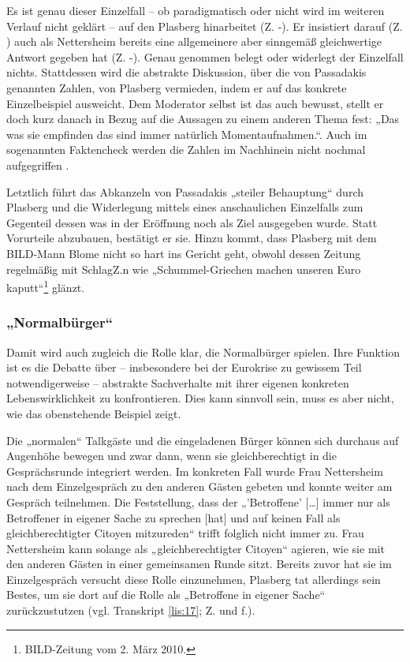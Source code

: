 Es ist genau dieser Einzelfall – ob paradigmatisch oder nicht wird im weiteren Verlauf nicht geklärt – auf den Plasberg hinarbeitet (Z. -). Er insistiert darauf (Z. ) auch als Nettersheim bereits eine allgemeinere aber sinngemäß gleichwertige Antwort gegeben hat (Z. -). Genau genommen belegt oder widerlegt der Einzelfall nichts. Stattdessen wird die abstrakte Diskussion, über die von Passadakis genannten Zahlen, von Plasberg vermieden, indem er auf das konkrete Einzelbeispiel ausweicht. Dem Moderator selbst ist das auch bewusst, stellt er doch kurz danach in Bezug auf die Aussagen zu einem anderen Thema fest: „Das was sie empfinden das sind immer natürlich Momentaufnahmen.“. Auch im sogenannten Faktencheck werden die Zahlen im Nachhinein nicht nochmal aufgegriffen \parencite{o.a.FaktencheckHartAber2012}.

Letztlich führt das Abkanzeln von Passadakis „steiler Behauptung“ durch Plasberg  und die Widerlegung mittels eines anschaulichen Einzelfalls zum Gegenteil dessen was in der Eröffnung noch als Ziel ausgegeben wurde. Statt Vorurteile abzubauen, bestätigt er sie. Hinzu kommt, dass Plasberg mit dem BILD-Mann Blome nicht so hart ins Gericht geht, obwohl dessen Zeitung regelmäßig mit SchlagZ.n wie „Schummel-Griechen machen unseren Euro kaputt“\footnote{BILD-Zeitung vom 2. März 2010.} glänzt.

\subsubsection{„Normalbürger“}

Damit wird auch zugleich die Rolle klar, die Normalbürger spielen. Ihre Funktion ist es die Debatte über – insbesondere bei der Eurokrise zu gewissem Teil notwendigerweise – abstrakte Sachverhalte mit ihrer eigenen konkreten Lebenswirklichkeit zu konfrontieren. Dies kann sinnvoll sein, muss es aber nicht, wie das obenstehende Beispiel zeigt.

Die „normalen“ Talkgäste und die eingeladenen Bürger können sich durchaus auf Augenhöhe bewegen und zwar dann, wenn sie gleichberechtigt in die Gesprächsrunde integriert werden. Im konkreten Fall wurde Frau Nettersheim nach dem Einzelgespräch zu den anderen Gästen gebeten und konnte weiter am Gespräch teilnehmen. Die Feststellung, dass der „'Betroffene' [\ldots]  immer nur als Betroffener in eigener Sache zu sprechen [hat] und auf keinen Fall als gleichberechtigter Citoyen mitzureden“ \parencite[7]{gaeblerUndUnserenTaeglichen2011} trifft folglich nicht immer zu. Frau Nettersheim kann solange als „gleichberechtigter Citoyen“ agieren, wie sie mit den anderen Gästen in einer gemeinsamen Runde sitzt. Bereits zuvor hat sie im Einzelgespräch versucht diese Rolle einzunehmen, Plasberg tat allerdings sein Bestes, um sie dort auf die Rolle als „Betroffene in eigener Sache“ zurückzustutzen (vgl. Transkript \vref{lis:17}; Z.  und f.).

